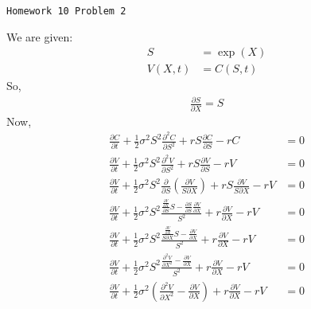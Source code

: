 \documentclass[12pt]{article}
\begin{document}
	\begin{center}
        \Large{\texttt{Homework 10 Problem 2}} \vspace*{0.8mm}  
	\end{center}
    We are given:
    \begin{align*}
      S &= \exp(X) \\
      V(X,t) &= C(S,t)
    \end{align*}
    So,
    \begin{align*}
      \frac{\partial S}{\partial X} = S
    \end{align*}
    Now,
    \begin{align*}
      \frac{\partial C}{\partial t} + \frac{1}{2} \sigma^2 S^2 \frac{\partial^2 C}{\partial S^2} + rS \frac{\partial C}{\partial S} - rC &= 0\\
      \frac{\partial V}{\partial t} + \frac{1}{2} \sigma^2 S^2 \frac{\partial^2 V}{\partial S^2} + rS \frac{\partial V}{\partial S} - rV &= 0\\
      \frac{\partial V}{\partial t} + \frac{1}{2} \sigma^2 S^2 \frac{\partial}{\partial S} \left( \frac{\partial V}{S \partial X} \right) + rS \frac{\partial V}{S \partial X} - rV &= 0\\
      \frac{\partial V}{\partial t} + \frac{1}{2} \sigma^2 S^2  \frac{ \frac{\frac{\partial V}{\partial X}}{ \partial S} S - \frac{\partial S}{\partial S} \frac{\partial V }{\partial X}} {S^2} + r \frac{\partial V}{ \partial X} - rV &= 0\\
      \frac{\partial V}{\partial t} + \frac{1}{2} \sigma^2 S^2  \frac{ \frac{\frac{\partial V}{\partial X}}{ S \partial X} S - \frac{\partial V }{\partial X}} {S^2} + r\frac{\partial V}{\partial X} - rV &= 0\\
      \frac{\partial V}{\partial t} + \frac{1}{2} \sigma^2 S^2  \frac{ \frac{\partial^2 V}{\partial X^2 } - \frac{\partial V }{\partial X}} {S^2} + r \frac{\partial V}{ \partial X} - rV &= 0\\
      \frac{\partial V}{\partial t} + \frac{1}{2} \sigma^2 \left( \frac{\partial^2 V}{\partial X^2 } - \frac{\partial V }{\partial X} \right) + r\frac{\partial V}{\partial X} - rV &= 0\\
    \end{align*}
    \clearpage
  
\end{document}
